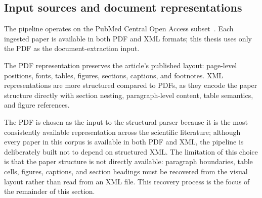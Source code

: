 \subsection{Input sources and document representations}\label{subsec:doc-input-sources}

The pipeline operates on the PubMed Central Open Access subset~\parencite{nlm_pmc_open_access}. Each ingested paper is available in both PDF and XML formats; this thesis uses only the PDF as the document-extraction input.

The PDF representation preserves the article's published layout: page-level positions, fonts, tables, figures, sections, captions, and footnotes. XML representations are more structured compared to PDFs, as they encode the paper structure directly with section nesting, paragraph-level content, table semantics, and figure references.

The PDF is chosen as the input to the structural parser because it is the most consistently available representation across the scientific literature; although every paper in this corpus is available in both PDF and XML, the pipeline is deliberately built not to depend on structured XML. The limitation of this choice is that the paper structure is not directly available: paragraph boundaries, table cells, figures, captions, and section headings must be recovered from the visual layout rather than read from an XML file. This recovery process is the focus of the remainder of this section.
